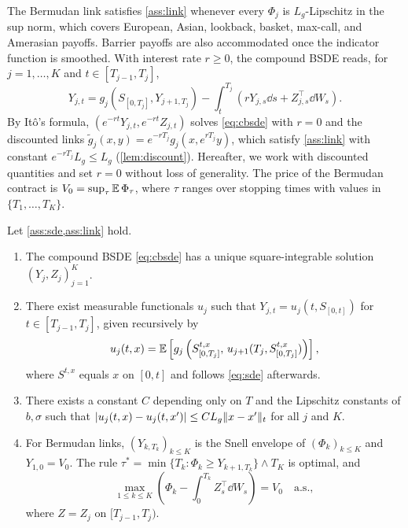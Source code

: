The Bermudan link satisfies \cref{ass:link} whenever every $\Phi_j$ is $L_g$-Lipschitz in the sup norm, which covers European, Asian, lookback, basket, max-call, and Amerasian payoffs. Barrier payoffs are also accommodated once the indicator function is smoothed. With interest rate $r\ge0$, the compound BSDE reads, for $j=1,\dots,K$ and $t\in[T_{j-1},T_j]$,
\begin{equation}\label{eq:cbsde}
Y_{j,t}=g_j\left(S_{[0,T_j]},Y_{j+1,T_j}\right)-\int_t^{T_j}\left(rY_{j,s}\dd s+Z_{j,s}^\top\dd W_s\right).
\end{equation}
By It\^o's formula, $(e^{-rt}Y_{j,t},e^{-rt}Z_{j,t})$ solves \eqref{eq:cbsde} with $r=0$ and the discounted links $\tilde g_j(x,y)=e^{-rT_j}g_j(x,e^{rT_j}y)$, which satisfy \cref{ass:link} with constant $e^{-rT_j}L_g\le L_g$ (\cref{lem:discount}). Hereafter, we work with discounted quantities and set $r=0$ without loss of generality. The price of the Bermudan contract is $V_0=\sup_\tau\mathbb{E}\,\Phi_\tau$, where $\tau$ ranges over stopping times with values in $\{T_1,\dots,T_K\}$.

\begin{theorem}\label{thm:wellposed}
Let \cref{ass:sde,ass:link} hold.
\begin{enumerate}[label=(\roman*)]
\item The compound BSDE \eqref{eq:cbsde} has a unique square-integrable solution $(Y_j,Z_j)_{j=1}^K$.
\item There exist measurable functionals $u_j$ such that $Y_{j,t}=u_j(t,S_{[0,t]})$ for $t\in[T_{j-1},T_j]$, given recursively by
\[
u_j(t,x)=\mathbb{E}\left[g_j\left(S^{t,x}_{[0,T_j]},\,u_{j+1}(T_j,S^{t,x}_{[0,T_j]})\right)\right],
\]
where $S^{t,x}$ equals $x$ on $[0,t]$ and follows \eqref{eq:sde} afterwards.
\item There exists a constant $C$ depending only on $T$ and the Lipschitz constants of $b,\sigma$ such that $\lvert u_j(t,x)-u_j(t,x')\rvert\le CL_g\lVert x-x'\rVert_t$ for all $j$ and $K$.
\item For Bermudan links, $(Y_{k,T_k})_{k\le K}$ is the Snell envelope of $(\Phi_k)_{k\le K}$ and $Y_{1,0}=V_0$. The rule $\tau^*=\min\{T_k:\Phi_k\ge Y_{k+1,T_k}\}\wedge T_K$ is optimal, and
\begin{equation}\label{eq:dual-identity}
\max_{1\le k\le K}\left(\Phi_k-\int_0^{T_k}Z_s^\top\dd W_s\right)=V_0\quad\text{a.s.},
\end{equation}
where $Z=Z_j$ on $[T_{j-1},T_j)$.
\end{enumerate}
\end{theorem}

